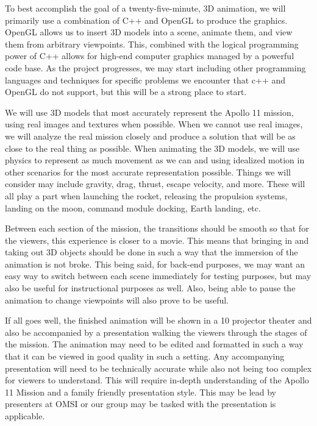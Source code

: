 \documentclass[onecolumn, draftclsnofoot,10pt, compsoc]{IEEEtran}
\begin{document}
To best accomplish the goal of a twenty-five-minute, 3D animation, we will primarily use a combination of C++ and OpenGL to produce the graphics. OpenGL allows us to insert 3D models into a scene, animate them, and view them from arbitrary viewpoints. This, combined with the logical programming power of C++ allows for high-end computer graphics managed by a powerful code base. As the project progresses, we may start including other programming languages and techniques for specific problems we encounter that c++ and OpenGL do not support, but this will be a strong place to start. 
 
We will use 3D models that most accurately represent the Apollo 11 mission, using real images and textures when possible. When we cannot use real images, we will analyze the real mission closely and produce a solution that will be as close to the real thing as possible. When animating the 3D models, we will use physics to represent as much movement as we can and using idealized motion in other scenarios for the most accurate representation possible. Things we will consider may include gravity, drag, thrust, escape velocity, and more. These will all play a part when launching the rocket, releasing the propulsion systems, landing on the moon, command module docking, Earth landing, etc. 

Between each section of the mission, the transitions should be smooth so that for the viewers, this experience is closer to a movie. This means that bringing in and taking out 3D objects should be done in such a way that the immersion of the animation is not broke. This being said, for back-end purposes, we may want an easy way to switch between each scene immediately for testing purposes, but may also be useful for instructional purposes as well. Also, being able to pause the animation to change viewpoints will also prove to be useful.

If all goes well, the finished animation will be shown in a 10 projector theater and also be accompanied by a presentation walking the viewers through the stages of the mission. The animation may need to be edited and formatted in such a way that it can be viewed in good quality in such a setting. Any accompanying presentation will need to be technically accurate while also not being too complex for viewers to understand. This will require in-depth understanding of the Apollo 11 Mission and a family friendly presentation style. This may be lead by presenters at OMSI or our group may be tasked with the presentation is applicable. 
\end{document}
